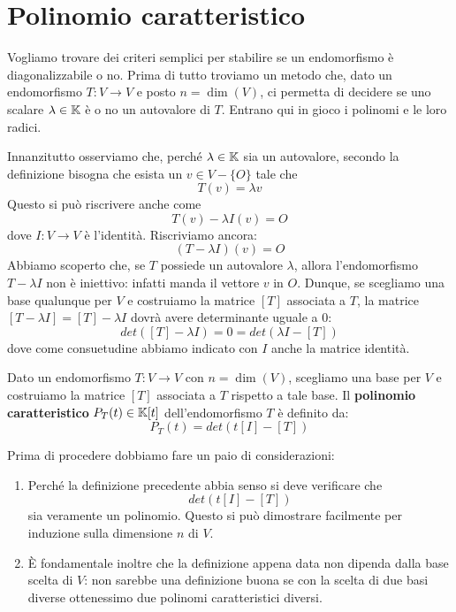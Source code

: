 \section{Polinomio caratteristico}
Vogliamo trovare dei criteri semplici per stabilire se un endomorfismo
è diagonalizzabile o no. Prima di tutto troviamo un metodo che, dato un
endomorfismo $T : V \to V$ e posto $n = \dim(V)$, ci permetta di decidere se
uno scalare $\lambda \in \mathbb{K}$ è o no un autovalore di $T$. Entrano
qui in gioco i polinomi e le loro radici.

Innanzitutto osserviamo che, perché $\lambda \in \mathbb{K}$ sia un
autovalore, secondo la definizione bisogna che esista un $v \in V - \{O\}$
tale che
\[
	T(v) = \lambda v
\]
Questo si può riscrivere anche come
\[
	T(v) - \lambda I(v) = O
\]
dove $I : V \to V$ è l'identità. Riscriviamo ancora:
\[
	(T - \lambda I)(v) = O
\]
Abbiamo scoperto che, se $T$ possiede un autovalore $\lambda$, allora
l'endomorfismo $T - \lambda I$ non è iniettivo: infatti manda il vettore
$v$ in $O$. Dunque, se scegliamo una base qualunque per $V$ e costruiamo la
matrice $[T]$ associata a $T$, la matrice $[T - \lambda I] = [T] - \lambda I$
dovrà avere determinante uguale a 0:
\[
	det([T] - \lambda I) = 0 = det(\lambda I - [T])
\]
dove come consuetudine abbiamo indicato con $I$ anche la matrice identità.

\begin{definition}
	Dato un endomorfismo $T : V \to V$ con $n = \dim(V)$, scegliamo una base
	per $V$ e costruiamo la matrice $[T]$ associata a $T$ rispetto a tale
	base. Il \textbf{polinomio caratteristico} $P_T(t) \in \mathbb{K}[t]$
	dell'endomorfismo $T$ è definito da:
	\[
		P_T(t) = det(t[I] - [T])
	\]
\end{definition}

\begin{observation}
	Prima di procedere dobbiamo fare un paio di considerazioni:
	\begin{enumerate}
		\item Perché la definizione precedente abbia senso si deve verificare
		      che \[det(t[I] - [T])\] sia veramente un polinomio. Questo si può
		      dimostrare facilmente per induzione sulla dimensione
		      $n$ di $V$.
		\item È fondamentale inoltre che la definizione appena data non dipenda
		      dalla base scelta di $V$: non sarebbe una definizione buona se con
		      la scelta di due basi diverse ottenessimo due polinomi
		      caratteristici diversi.
	\end{enumerate}
\end{observation}

